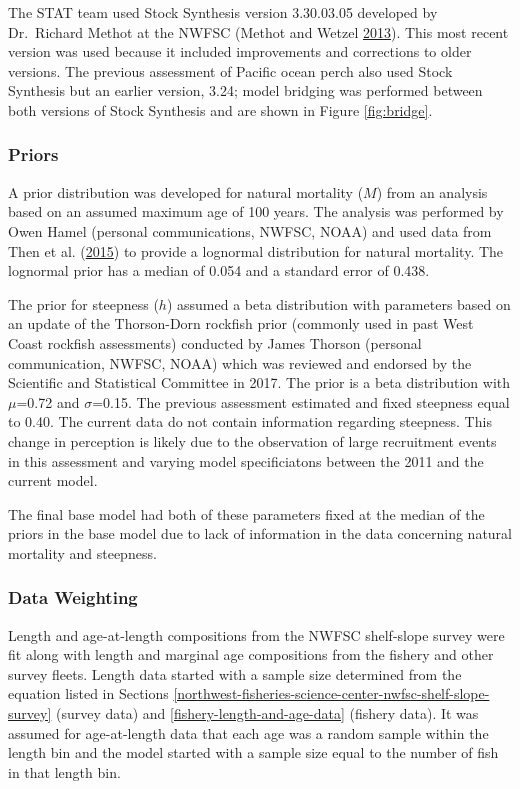 \documentclass[12pt,]{article}
\begin{document}
The STAT team used Stock Synthesis version 3.30.03.05 developed by
Dr.~Richard Methot at the NWFSC (Methot and Wetzel
\protect\hyperlink{ref-methot_stock_2013}{2013}). This most recent
version was used because it included improvements and corrections to
older versions. The previous assessment of Pacific ocean perch also used
Stock Synthesis but an earlier version, 3.24; model bridging was
performed between both versions of Stock Synthesis and are shown in
Figure \ref{fig:bridge}.

\subsubsection{Priors}\label{priors}

A prior distribution was developed for natural mortality (\(M\)) from an
analysis based on an assumed maximum age of 100 years. The analysis was
performed by Owen Hamel (personal communications, NWFSC, NOAA) and used
data from Then et al.
(\protect\hyperlink{ref-then_evaluating_2015}{2015}) to provide a
lognormal distribution for natural mortality. The lognormal prior has a
median of 0.054 and a standard error of 0.438.

The prior for steepness (\(h\)) assumed a beta distribution with
parameters based on an update of the Thorson-Dorn rockfish prior
(commonly used in past West Coast rockfish assessments) conducted by
James Thorson (personal communication, NWFSC, NOAA) which was reviewed
and endorsed by the Scientific and Statistical Committee in 2017. The
prior is a beta distribution with \(\mu\)=0.72 and \(\sigma\)=0.15. The
previous assessment estimated and fixed steepness equal to 0.40. The
current data do not contain information regarding steepness. This change
in perception is likely due to the observation of large recruitment
events in this assessment and varying model specificiatons between the
2011 and the current model.

The final base model had both of these parameters fixed at the median of
the priors in the base model due to lack of information in the data
concerning natural mortality and steepness.

\subsubsection{Data Weighting}\label{data-weighting}

Length and age-at-length compositions from the NWFSC shelf-slope survey
were fit along with length and marginal age compositions from the
fishery and other survey fleets. Length data started with a sample size
determined from the equation listed in Sections
\ref{northwest-fisheries-science-center-nwfsc-shelf-slope-survey}
(survey data) and \ref{fishery-length-and-age-data} (fishery data). It
was assumed for age-at-length data that each age was a random sample
within the length bin and the model started with a sample size equal to
the number of fish in that length bin.
\end{document}
